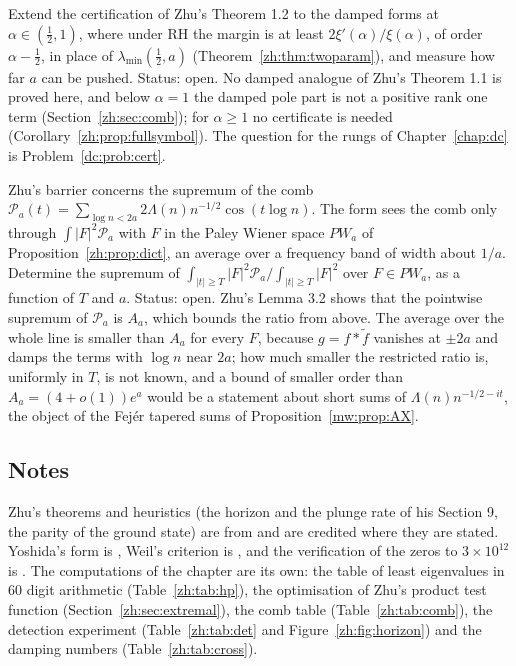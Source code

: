 \begin{problem}\label{zh:op:damped}
Extend the certification of Zhu's Theorem 1.2 to the damped forms at $\alpha\in(\frac12,1)$, where under RH the margin is at least $2\xi'(\alpha)/\xi(\alpha)$, of order $\alpha-\frac12$, in place of $\lambda_{\min}(\frac12,a)$ (Theorem~\ref{zh:thm:twoparam}), and measure how far $a$ can be pushed. Status: open. No damped analogue of Zhu's Theorem 1.1 is proved here, and below $\alpha=1$ the damped pole part is not a positive rank one term (Section~\ref{zh:sec:comb}); for $\alpha\ge1$ no certificate is needed (Corollary~\ref{zh:prop:fullsymbol}). The question for the rungs of Chapter~\ref{chap:dc} is Problem~\ref{dc:prob:cert}.
\end{problem}

\begin{problem}\label{zh:op:comb}
Zhu's barrier concerns the supremum of the comb $\mathcal P_a(t)=\sum_{\log n<2a}2\Lambda(n)n^{-1/2}\cos(t\log n)$. The form sees the comb only through $\int|F|^2\mathcal P_a$ with $F$ in the Paley Wiener space $PW_a$ of Proposition~\ref{zh:prop:dict}, an average over a frequency band of width about $1/a$. Determine the supremum of $\int_{|t|\ge T}|F|^2\mathcal P_a\big/\int_{|t|\ge T}|F|^2$ over $F\in PW_a$, as a function of $T$ and $a$. Status: open. Zhu's Lemma 3.2 shows that the pointwise supremum of $\mathcal P_a$ is $A_a$, which bounds the ratio from above. The average over the whole line is smaller than $A_a$ for every $F$, because $g=f*\widetilde f$ vanishes at $\pm2a$ and damps the terms with $\log n$ near $2a$; how much smaller the restricted ratio is, uniformly in $T$, is not known, and a bound of smaller order than $A_a=(4+o(1))e^a$ would be a statement about short sums of $\Lambda(n)n^{-1/2-it}$, the object of the Fej\'er tapered sums of Proposition~\ref{mw:prop:AX}.
\end{problem}

\subsection*{Notes}

Zhu's theorems and heuristics (the horizon and the plunge rate of his Section 9, the parity of the ground state) are from \cite{Zhu26} and are credited where they are stated. Yoshida's form is \cite{Yoshida92}, Weil's criterion is \cite{Weil52,Bombieri}, and the verification of the zeros to $3\times10^{12}$ is \cite{PT21}. The computations of the chapter are its own: the table of least eigenvalues in $60$ digit arithmetic (Table~\ref{zh:tab:hp}), the optimisation of Zhu's product test function (Section~\ref{zh:sec:extremal}), the comb table (Table~\ref{zh:tab:comb}), the detection experiment (Table~\ref{zh:tab:det} and Figure~\ref{zh:fig:horizon}) and the damping numbers (Table~\ref{zh:tab:cross}).
